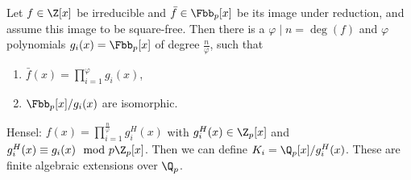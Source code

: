 \documentclass{jvfscript}
\begin{document}
	\begin{thm}
		Let $ f \in \Z[x] $ be irreducible and $ \bar{f} \in \Fbb_p[x] $ be its image under reduction, and assume this image to be square-free. Then there is a $\varphi \mid n = \deg(f)$ and $\varphi$ polynomials $ g_i(x) = \Fbb_p[x] $ of degree $ \frac{n}{\varphi} $, such that
		\begin{enumerate}[label={\roman*})]
			\item $ \bar{f}(x) = \prod_{i=1}^{\varphi} g_i(x) $,
			\item $ \Fbb_p[x]/g_i(x) $ are isomorphic.
		\end{enumerate}
	\end{thm}
	Hensel: $ f(x) = \prod_{i=1}^{\frac{n}{\varphi}} g_i^H(x) $ with $ g_i^H(x) \in \Z_p[x] $ and $ g_i^H(x) \equiv g_i(x) \mod p\Z_p[x] $. Then we can define $ K_i = \Q_p[x]/g_i^H(x) $. These are finite algebraic extensions over $\Q_p$.
	
	
	
	\printindex
\end{document}

